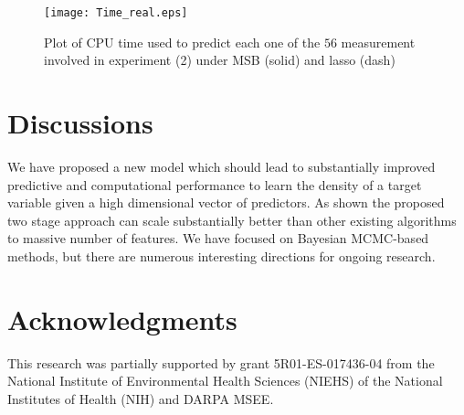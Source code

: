 \documentclass{article}
\begin{document}
\begin{figure}
\centering
\texttt{[image: Time\_real.eps]}
\caption{Plot of CPU time used to predict each one of the $56$ measurement involved in experiment (2) under MSB (solid) and lasso (dash)} \label{fig:real}
\end{figure}


\section*{Discussions}
We have proposed a new model which should lead to substantially improved predictive and computational performance to learn the density of a target variable given a high dimensional vector of predictors. As shown the proposed two stage approach can scale substantially better than other existing algorithms to massive number of features. We have focused on Bayesian MCMC-based methods, but there are numerous interesting directions for ongoing research.

\section*{Acknowledgments}
This research was partially supported by grant 5R01-ES-017436-04 from the National Institute of Environmental Health Sciences (NIEHS) of the National Institutes of Health (NIH) and DARPA MSEE.

\nocite{*}


\end{document}
